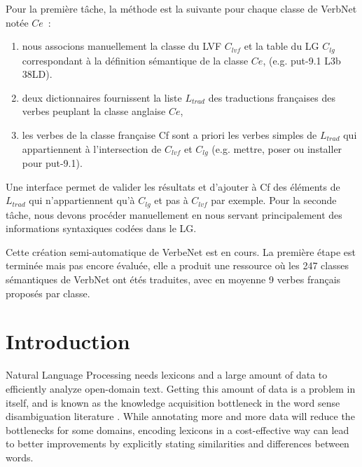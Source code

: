Pour la première tâche, la méthode est la suivante pour chaque classe de
VerbNet notée $Ce$~:

\begin{enumerate}

    \item nous associons manuellement la classe du LVF $C_{lvf}$ et la table du
        LG $C_{lg}$ correspondant à la définition sémantique de la classe $Ce$,
        (e.g. put-9.1 L3b 38LD).

    \item deux dictionnaires fournissent la liste $L_{trad}$ des traductions
        françaises des verbes peuplant la classe anglaise $Ce$, 

    \item les verbes de la classe française Cf sont a priori les verbes simples
        de $L_{trad}$ qui appartiennent à l'intersection de $C_{lvf}$ et
        $C_{lg}$ (e.g. mettre, poser ou installer pour put-9.1).

\end{enumerate}

Une interface permet de valider les résultats et d'ajouter à Cf des éléments de
$L_{trad}$ qui n'appartiennent qu'à $C_{lg}$ et pas à $C_{lvf}$ par exemple.
Pour la seconde tâche, nous devons procéder manuellement en nous servant
principalement des informations syntaxiques codées dans le LG.

Cette création semi-automatique de VerbeNet est en cours. La première étape est
terminée mais pas encore évaluée, elle a produit une ressource où les 247
classes sémantiques de VerbNet ont étés traduites, avec en moyenne 9 verbes
français proposés par classe.

\section{Introduction}

Natural Language Processing needs lexicons and a large amount of data to
efficiently analyze open-domain text. Getting this amount of data is a problem
in itself, and is known as the knowledge acquisition bottleneck in the word
sense disambiguation literature \citep{gale1992using}. While annotating
more and more data will reduce the bottlenecks for some domains, encoding
lexicons in a cost-effective way can lead to better improvements by explicitly
stating similarities and differences between words.

